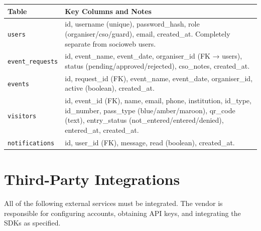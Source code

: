 \documentclass[12pt,a4paper]{article}
\begin{document}
\begin{tabularx}{\textwidth}{L{3.5cm} X}
\toprule
{}
\textbf{Table} & \textbf{Key Columns and Notes} \\
\midrule
\texttt{users} & id, username (unique), password\_hash, role (organiser/cso/guard), email, created\_at. Completely separate from socioweb users. \\
\addlinespace
\texttt{event\_requests} & id, event\_name, event\_date, organiser\_id (FK → users), status (pending/approved/rejected), cso\_notes, created\_at. \\
\addlinespace
\texttt{events} & id, request\_id (FK), event\_name, event\_date, organiser\_id, active (boolean), created\_at. \\
\addlinespace
\texttt{visitors} & id, event\_id (FK), name, email, phone, institution, id\_type, id\_number, pass\_type (blue/amber/maroon), qr\_code (text), entry\_status (not\_entered/entered/denied), entered\_at, created\_at. \\
\addlinespace
\texttt{notifications} & id, user\_id (FK), message, read (boolean), created\_at. \\
\bottomrule
\end{tabularx}

\newpage
\section{Third-Party Integrations}

All of the following external services must be integrated. The vendor is responsible for configuring accounts, obtaining API keys, and integrating the SDKs as specified.
\end{document}
